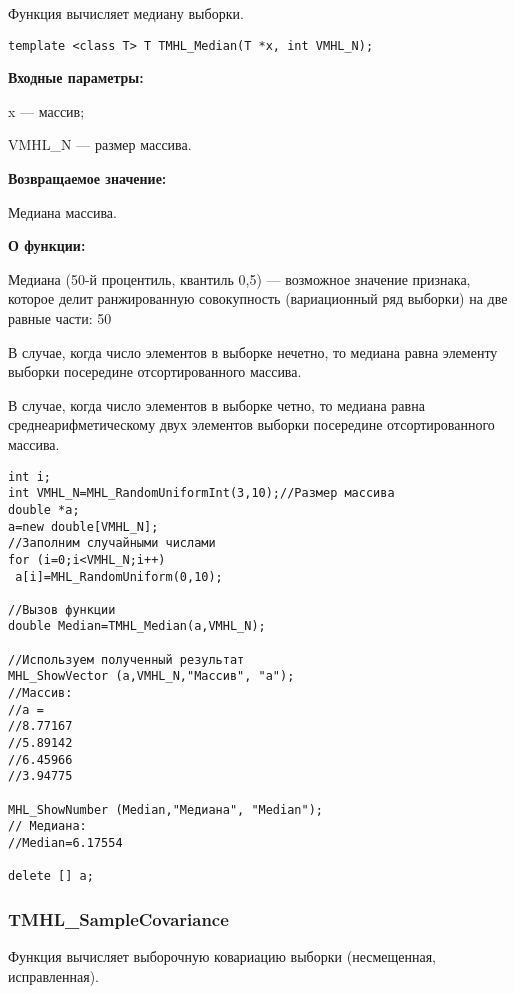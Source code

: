 \documentclass[a4paper,12pt]{article}
\begin{document}
Функция вычисляет медиану выборки.


\begin{lstlisting}[label=code_syntax_TMHL_Median,caption=Синтаксис]
template <class T> T TMHL_Median(T *x, int VMHL_N);
\end{lstlisting}

\textbf{Входные параметры:}

 x --- массив;
 
 VMHL\_N --- размер массива.

\textbf{Возвращаемое значение:}

 Медиана массива.
 
\textbf{ О функции:}

Медиана (50-й процентиль, квантиль 0,5) — возможное значение признака, которое делит ранжированную совокупность (вариационный ряд выборки) на две равные части: 50 %

В случае, когда число элементов в выборке нечетно, то медиана равна элементу выборки посередине отсортированного массива.

В случае, когда число элементов в выборке четно, то медиана равна среднеарифметическому двух элементов выборки посередине отсортированного массива.



\begin{lstlisting}[label=code_use_TMHL_Median,caption=Пример использования]
int i;
int VMHL_N=MHL_RandomUniformInt(3,10);//Размер массива
double *a;
a=new double[VMHL_N];
//Заполним случайными числами
for (i=0;i<VMHL_N;i++)
 a[i]=MHL_RandomUniform(0,10);

//Вызов функции
double Median=TMHL_Median(a,VMHL_N);

//Используем полученный результат
MHL_ShowVector (a,VMHL_N,"Массив", "a");
//Массив:
//a =
//8.77167
//5.89142
//6.45966
//3.94775

MHL_ShowNumber (Median,"Медиана", "Median");
// Медиана:
//Median=6.17554

delete [] a;
\end{lstlisting}

\subsubsection{TMHL\_SampleCovariance}\label{TMHL_SampleCovariance}

Функция вычисляет выборочную ковариацию выборки (несмещенная, исправленная).
\end{document}
